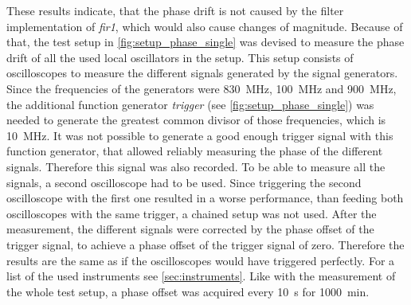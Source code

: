 \documentclass[12pt,a4paper,parskip=full,abstract=true,BCOR=12mm,twoside,open=right]{scrreprt}
\def\device#1{\textit{#1}}
\begin{document}
These results indicate, that the phase drift is not caused by the filter implementation of
\device{fir1}, which would also cause changes of magnitude. Because of that, the test
setup in \cref{fig:setup_phase_single} was devised to measure the phase drift of all the
used local oscillators in the setup. This setup consists of oscilloscopes to measure
the different signals generated by the signal generators. Since the frequencies
of the generators were \SI{830}{\mega\hertz}, \SI{100}{\mega\hertz} and \SI{900}{\mega\hertz},
the additional function generator \device{trigger} (see \cref{fig:setup_phase_single}) was needed to
generate the greatest common divisor of those frequencies, which is \SI{10}{\mega\hertz}.
It was not possible to generate a good enough trigger signal with this function generator, that
allowed reliably measuring the phase of the different signals. Therefore this signal was also recorded.
To be able to measure all the signals, a second oscilloscope had to be used. Since triggering
the second oscilloscope with the first one resulted in a worse performance, than feeding both
oscilloscopes with the same trigger, a chained setup was not used. After the measurement, the
different signals were corrected by the phase offset of the trigger signal, to achieve a phase
offset of the trigger signal of zero. Therefore the results are the same as if the oscilloscopes would
have triggered perfectly. For a list of the used instruments see \cref{sec:instruments}.
Like with the measurement of the whole test setup, a phase offset was acquired every \SI{10}{\second}
for \SI{1000}{\minute}.
\end{document}
